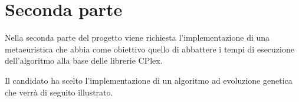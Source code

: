 %
%
\chapter{Seconda parte}
\label{pt2}
Nella seconda parte del progetto viene richiesta l'implementazione di una metaeuristica che abbia come obiettivo quello di abbattere i tempi di esecuzione dell'algoritmo alla base delle librerie CPlex.

Il candidato ha scelto l'implementazione di un algoritmo ad evoluzione genetica che verrà di seguito illustrato.





